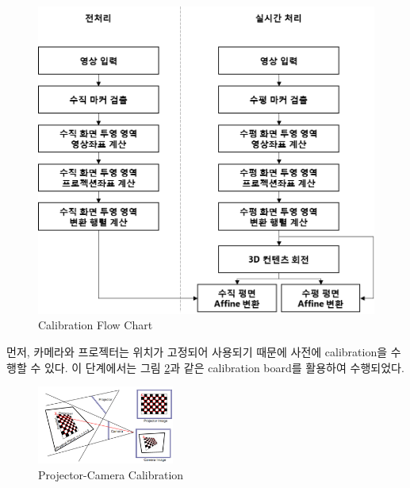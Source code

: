 \begin{figure}[ht!]
	\centering
    \includegraphics[width=1.0\textwidth]{3-System/flowchart_calibration}
	\caption{Calibration Flow Chart}
    \label{fig:flowchart_calibration}
\end{figure}

먼저, 카메라와 프로젝터는 위치가 고정되어 사용되기 때문에 사전에 calibration을 수행할 수 있다. 이 단계에서는 그림 \ref{fig:procam_calibration}과 같은 calibration board를 활용하여 수행되었다.
\begin{figure}[ht!]
	\centering
    \includegraphics[width=0.4\textwidth]{3-System/calibration1}
	\caption{Projector-Camera Calibration}
    \label{fig:procam_calibration}
\end{figure}


